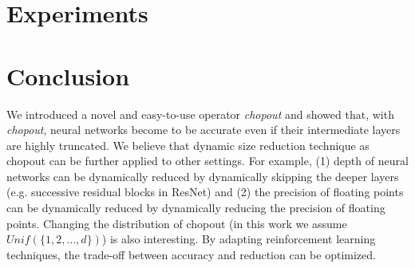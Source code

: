 \documentclass{article}
\begin{document}
    \section{Experiments}
    \label{experiments}


    \section{Conclusion}
    \label{conclusion}
    We introduced a novel and easy-to-use operator \textit{chopout} and showed that, with \textit{chopout}, neural networks become to be accurate even if their intermediate layers are highly truncated. 
    We believe that dynamic size reduction technique as chopout can be further applied to other settings. For example, (1) depth of neural networks can be dynamically reduced by dynamically skipping the deeper layers (e.g. successive residual blocks in ResNet) and (2) the precision of floating points can be dynamically reduced by dynamically reducing the precision of floating points. 
    Changing the distribution of chopout (in this work we assume $Unif(\{1, 2, \dots, d\})$) is also interesting. By adapting reinforcement learning techniques, the trade-off between accuracy and reduction can be optimized.
    

    
    
    
        
    
    
    
    
\end{document}
